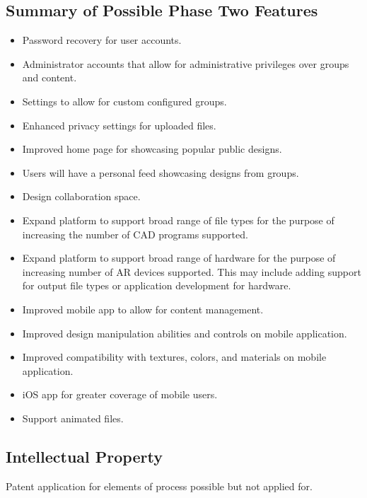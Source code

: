 \subsection{Summary of Possible Phase Two Features}
\begin{itemize}
	\item Password recovery for user accounts.
	\item Administrator accounts that allow for administrative privileges over groups and content. 
	\item Settings to allow for custom configured groups. 
	\item Enhanced privacy settings for uploaded files.
	\item Improved home page for showcasing popular public designs. 
	\item Users will have a personal feed showcasing designs from groups.
	\item Design collaboration space. 
	\item Expand platform to support broad range of file types for the purpose of increasing the number of CAD programs supported. 
	\item Expand platform to support broad range of hardware for the purpose of increasing number of AR devices supported. This may include adding support for output file types or application development for hardware. 
	\item Improved mobile app to allow for content management. 
	\item Improved design manipulation abilities and controls on mobile application. 
	\item Improved compatibility with textures, colors, and materials on mobile application.
	\item iOS app for greater coverage of mobile users.
	\item Support animated files. 
\end{itemize}


\subsection{Intellectual Property}
Patent application for elements of process possible but not applied for. 

